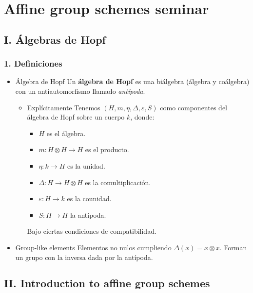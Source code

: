 \documentclass[11pt]{article}
\begin{document}
\section*{Affine group schemes seminar}
\label{sec-8}
\subsection*{I. Álgebras de Hopf}
\label{sec-8-1}
\subsubsection*{1. Definiciones}
\label{sec-8-1-1}
\begin{itemize}
\item Álgebra de Hopf
\label{sec-8-1-1-1}
Un \textbf{álgebra de Hopf} es una biálgebra (álgebra y coálgebra) con un 
antiautomorfismo llamado \emph{antípoda}.

\begin{itemize}
\item Explícitamente
\label{sec-8-1-1-1-1}
Tenemos $(H, m, \eta, \Delta, \varepsilon, S)$ como componentes del álgebra de Hopf sobre
un cuerpo $k$, donde:

\begin{itemize}
\item $H$ es el álgebra.
\item $m : H \otimes H \to H$ es el producto.
\item $\eta : k \to H$ es la unidad.
\item $\Delta : H \to H \otimes H$ es la comultiplicación.
\item $\varepsilon : H \to k$ es la counidad.
\item $S : H \to H$ la antípoda.
\end{itemize}

Bajo ciertas condiciones de compatibilidad.
\end{itemize}

\item Group-like elements
\label{sec-8-1-1-2}
Elementos no nulos cumpliendo $\Delta(x) = x \otimes x$. Forman un grupo con la inversa
dada por la antípoda.
\end{itemize}

\subsection*{II. Introduction to affine group schemes}
\label{sec-8-2}
\end{document}
